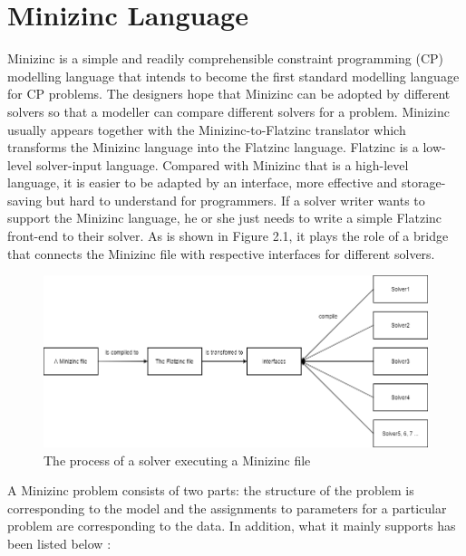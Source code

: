 \section{Minizinc Language}
Minizinc \cite{r10} is a simple and readily comprehensible constraint programming (CP) modelling language that intends to become the first standard modelling language for CP problems. The designers hope that Minizinc can be adopted by different solvers so that a modeller can compare different solvers for a problem. Minizinc usually appears together with the Minizinc-to-Flatzinc translator which transforms the Minizinc language into the Flatzinc language. Flatzinc \cite{r10} is a low-level solver-input language. Compared with Minizinc that is a high-level language, it is easier to be adapted by an interface, more effective and storage-saving but hard to understand for programmers. If a solver writer wants to support the Minizinc language, he or she just needs to write a simple Flatzinc front-end to their solver. As is shown in Figure 2.1, it plays the role of a bridge that connects the Minizinc file with respective interfaces for different solvers. 
\begin{figure}[htbp]
\centering
\includegraphics[width=0.8\linewidth]{figs/flowofMinizinc.png}
\caption{The process of a solver executing a Minizinc file}
  \label{fig:process}
\end{figure}
A Minizinc problem consists of two parts: the structure of the problem is corresponding to the model and the assignments to parameters for a particular problem are corresponding to the data. In addition, what it mainly supports has been listed below \cite{r10}:\\
